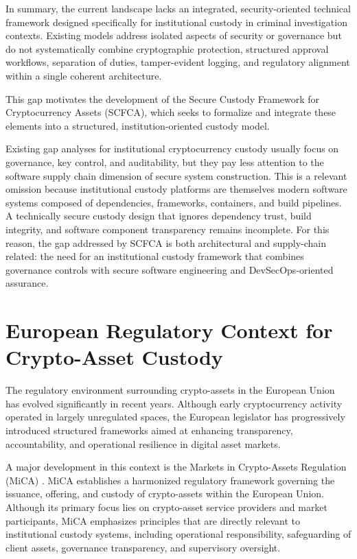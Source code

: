 \documentclass[12pt,a4paper]{report}
\begin{document}
In summary, the current landscape lacks an integrated, security-oriented technical framework designed specifically for institutional custody in criminal investigation contexts. Existing models address isolated aspects of security or governance but do not systematically combine cryptographic protection, structured approval workflows, separation of duties, tamper-evident logging, and regulatory alignment within a single coherent architecture. 

This gap motivates the development of the Secure Custody Framework for Cryptocurrency Assets (SCFCA), which seeks to formalize and integrate these elements into a structured, institution-oriented custody model.

Existing gap analyses for institutional cryptocurrency custody usually focus on governance, key control, and auditability, but they pay less attention to the software supply chain dimension of secure system construction. This is a relevant omission because institutional custody platforms are themselves modern software systems composed of dependencies, frameworks, containers, and build pipelines. A technically secure custody design that ignores dependency trust, build integrity, and software component transparency remains incomplete. For this reason, the gap addressed by SCFCA is both architectural and supply-chain related: the need for an institutional custody framework that combines governance controls with secure software engineering and DevSecOps-oriented assurance.

\section{European Regulatory Context for Crypto-Asset Custody}

The regulatory environment surrounding crypto-assets in the European Union has evolved significantly in recent years. Although early cryptocurrency activity operated in largely unregulated spaces, the European legislator has progressively introduced structured frameworks aimed at enhancing transparency, accountability, and operational resilience in digital asset markets.

A major development in this context is the Markets in Crypto-Assets Regulation (MiCA) \cite{MiCA2023}. MiCA establishes a harmonized regulatory framework governing the issuance, offering, and custody of crypto-assets within the European Union. Although its primary focus lies on crypto-asset service providers and market participants, MiCA emphasizes principles that are directly relevant to institutional custody systems, including operational responsibility, safeguarding of client assets, governance transparency, and supervisory oversight.
\end{document}
